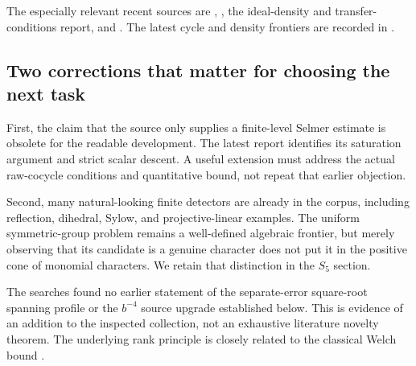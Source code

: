 The especially relevant recent sources are
,
,
{the ideal-density and transfer-conditions report}, and
\cite{priorreflection,priornonabelian,priorideal,priorarithmetic}.
The latest cycle and density frontiers are recorded in
\cite{prioradvance,priormcnew}.

\subsection{Two corrections that matter for choosing the next task}

First, the claim that the source only supplies a finite-level Selmer
estimate is obsolete for the readable development. The latest report
identifies its saturation argument and strict scalar descent. A useful
extension must address the actual raw-cocycle conditions and quantitative
bound, not repeat that earlier objection.

Second, many natural-looking finite detectors are already in the corpus,
including reflection, dihedral, Sylow, and projective-linear examples.
The uniform symmetric-group problem remains a well-defined algebraic
frontier, but merely observing that its candidate is a genuine character
does not put it in the positive cone of monomial characters. We retain
that distinction in the $S_5$ section.

The searches found no earlier statement of the separate-error square-root
spanning profile or the $b^{-4}$ source upgrade established below.
This is evidence of an addition to the inspected collection, not an
exhaustive literature novelty theorem. The underlying rank principle is
closely related to the classical Welch bound \cite{welch,mixon}.
